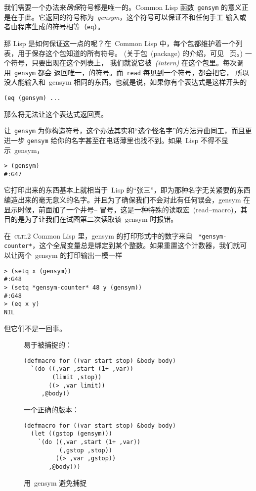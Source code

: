 我们需要一个办法来\emph{确保}符号都是唯一的。Common Lisp 函数~\texttt{gensym}
的意义正是在于此。它返回的符号称为~\emph{gensym}，这个符号可以保证不和任何手工
输入或者由程序生成的符号相等（\texttt{eq}）。

那 Lisp 是如何保证这一点的呢？在~Common Lisp 中，每个包都维护着一个列表，用于保存这个包知道的所有符号。
(关于包~(package) 的介绍，可见~\pageref{chap:packages} 页。) 一个符号，只要出现在这个列表上，
我们就说它被\emph{\intern~(intern)} 在这个包里。每次调用~\texttt{gensym} 都会
返回唯一，\unintern{}的符号。而~\texttt{read} 每见到一个符号，都会把它\intern{}，
所以没人能输入和~gensym 相同的东西。也就是说，如果你有个表达式是这样开头的
\begin{lstlisting}
(eq (gensym) ...
\end{lstlisting}
那么将无法让这个表达式返回真。

让~\texttt{gensym} 为你构造符号，这个办法其实和``选个怪名字''的方法异曲同工，而且更进一步
\pozhehao{}\texttt{gensym} 给你的名字甚至在电话薄里也找不到。如果~Lisp 不得不显示~gensym，
\begin{lstlisting}
> (gensym)
#:G47
\end{lstlisting}
它打印出来的东西基本上就相当于~Lisp 的“张三”，即为那种名字无关紧要的东西
编造出来的毫无意义的名字。并且为了确保我们不会对此有任何误会，gensym 在显示时候，前面加了一个井号--%
冒号，这是一种特殊的读取宏~(read--macro)，其目的是为了让我们在试图第二次读取该~gensym 时报错。

在~\textsc{cltl}2 Common Lisp 里，gensym 的打印形式中的数字来自
~\texttt{*gensym-counter*}，这个全局变量总是绑定到某个整数。如果重置这个计数器，我们就可以让两个~gensym 的打印输出一模一样
\begin{lstlisting}
> (setq x (gensym))
#:G48
> (setq *gensym-counter* 48 y (gensym))
#:G48
> (eq x y)
NIL
\end{lstlisting}
但它们不是一回事。

\begin{figure}
易于被捕捉的：
\begin{lstlisting}
(defmacro for ((var start stop) &body body)
  `(do ((,var ,start (1+ ,var))
        (limit ,stop))
       ((> ,var limit))
     ,@body))
\end{lstlisting}
一个正确的版本：
\begin{lstlisting}
(defmacro for ((var start stop) &body body)
  (let ((gstop (gensym)))
    `(do ((,var ,start (1+ ,var))
          (,gstop ,stop))
         ((> ,var ,gstop))
       ,@body)))
\end{lstlisting}
\caption{\label{fig:avoiding_capture_with_gensym}用~gensym 避免捕捉}
\end{figure}

